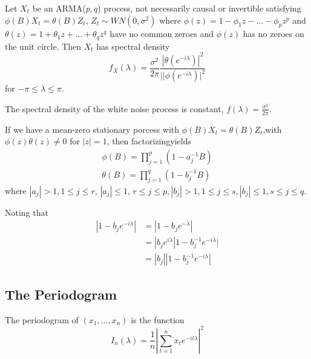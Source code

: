 \begin{thm}
  \label{sec:spectral-density-an-3}
  Let $X_{t}$ be an ARMA($p, q$) process, not necessarily causal or
  invertible satisfying $\phi(B)X_{t} = \theta(B) Z_{t}$, $Z_{t} \sim
  WN(0, \sigma^{2})$ where $\phi(z) = 1 - \phi_{1} z - \dots -
  \phi_{p} z^{p}$ and $\theta(z) = 1 + \theta_{1} z + \dots +
  \theta_{q} z^{q}$ have no common zeroes and $\phi(z)$ has no zeroes
  on the unit circle.  Then $X_{t}$ has spectral density
  \begin{equation}
    \label{eq:71}
    f_{X}(\lambda) = \frac{\sigma^{2}}{2 \pi} \frac{|\theta(e^{-i\lambda})|^{2}}{||\phi(e^{-i\lambda})|^{2}}
  \end{equation} for $-\pi \leq \lambda \leq \pi$.
\end{thm}

\begin{thm}
  \label{sec:spectral-density-an-4}
  The spectral density of the white noise process is constant,
  $f(\lambda) = \frac{\sigma^{2}}{2 \pi}$.
\end{thm}

\begin{thm}
  If we have a mean-zero stationary porcess with $\phi(B) X_{t} =
  \theta(B) Z_{t}$,with $\phi(z) \theta(z) \neq 0$ for $|z| = 1$, then
  factorizingyields
  \begin{align}
    \label{eq:80}
    \phi(B) = \prod_{j=1}^{p} (1 - a_{j}^{-1} B) \\
    \theta(B) = \prod_{j=1}^{q} (1-b_{j}^{-1} B)
  \end{align} where $|a_{j} | > 1, 1 \leq j \leq r$, $|a_{j}| \leq 1$,
  $r \leq j \leq p, |b_{j}| > 1, 1 \leq j \leq s, |b_{j}| \leq 1, s
  \leq j \leq q$.

  Noting that
  \begin{align}
    |1 - \overline b_{j} e^{-i\lambda}| &= |1 - b_{j} e^{-\lambda}| \\
    &= |b_{j} e^{i\lambda} | 1 - b_{j}^{-1} e^{-i\lambda}| \\
    &= | b_{j}| | 1 - b_{j}^{-1} e^{-i\lambda}|
  \end{align}
\end{thm}

\subsection{The Periodogram}
\label{sec:periodogram}

\begin{defn}
  \label{sec:periodogram-1}
  The periodogram of $(x_{1}, \dots, x_{n})$ is the function
  \begin{equation}
    \label{eq:74}
    I_{n}(\lambda) = \frac{1}{n} | \sum_{t=1}^{n} x_{t} e^{-it\lambda}|^{2}
  \end{equation}
\end{defn}

